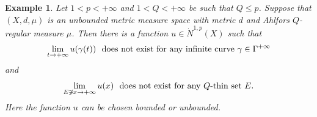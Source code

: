 \documentclass[10pt]{amsart}
\newtheorem{example}[theorem]{Example}
\numberwithin{equation}{section}
\begin{document}
\begin{example}
\label{example-homogeneous} Let $1<p<+\infty$ and $1<Q<+\infty$ be such that $Q\leq p$. Suppose that $(X,d,\mu)$ is an unbounded metric measure space with metric $d$ and Ahlfors $Q$-regular measure $\mu$. Then there is a function $u\in \dot N^{1,p}(X)$ such that 
	\begin{equation}\label{eq6.1-0306}
	\lim_{t\to+\infty}u(\gamma(t)) \text{\rm \ \ does not exist for any infinite curve $\gamma\in\Gamma^{+\infty}$}
	\end{equation}
and
	\begin{equation}\label{eq6.2-0306}
	\lim_{E\not \ni x\to+\infty}u(x) \text{\rm\ \ does not exist for any $Q$-thin set $E$}.
	\end{equation}
	Here the function $u$ can be chosen bounded or unbounded.
\end{example}
\end{document}
